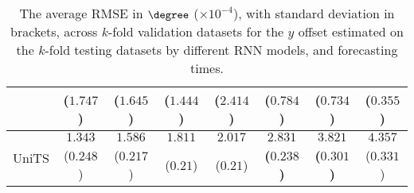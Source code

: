 \begin{table}[!ht]
{\begin{tabular}{|c|c|c|c|c|c|c|c|}
			 & ($1.747$) & ($1.645$) & ($1.444$) & ($2.414$) & ($0.784$) & ($0.734$) & ($0.355$) \\ \hline
			\multirow{2}{*}{UniTS} & $1.343$ & $1.586$ & $1.811$ & $2.017$ & $\mathbf{2.831}$ & $\mathbf{3.821}$ & $4.357$ \\
			 & ($0.248$) & ($0.217$) & ($0.21$) & ($0.21$) & \textbf{(}$\mathbf{0.238}$\textbf{)} & \textbf{(}$\mathbf{0.301}$\textbf{)} & ($0.331$) \\ \hline
		\end{tabular}
	}
	\caption{The average RMSE in $\degree$ ($\times 10^{-4}$), with standard deviation in brackets, across $k$-fold validation datasets for the $y$ offset estimated on the $k$-fold testing datasets by different RNN models, and forecasting times.}
	\label{tab:all_latitude_no_abs_RMSE}
\end{table}

